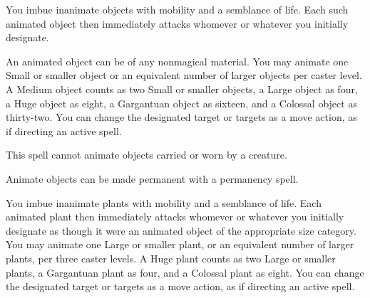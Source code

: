 \begin{multicols}{2}
\begin{small}

\noindent You imbue inanimate objects with mobility and a semblance of life. Each such animated object then immediately attacks whomever or whatever you initially designate.

\smallskip\noindent An animated object can be of any nonmagical material. You may animate one Small or smaller object or an equivalent number of larger objects per caster level. A Medium object counts as two Small or smaller objects, a Large object as four, a Huge object as eight, a Gargantuan object as sixteen, and a Colossal object as thirty-two. You can change the designated target or targets as a move action, as if directing an active spell.

\smallskip\noindent This spell cannot animate objects carried or worn by a creature.

\smallskip\noindent Animate objects can be made permanent with a permanency spell.

\smallskip\noindent You imbue inanimate plants with mobility and a semblance of life. Each animated plant then immediately attacks whomever or whatever you initially designate as though it were an animated object of the appropriate size category. You may animate one Large or smaller plant, or an equivalent number of larger plants, per three caster levels. A Huge plant counts as two Large or smaller plants, a Gargantuan plant as four, and a Colossal plant as eight. You can change the designated target or targets as a move action, as if directing an active spell.


\end{small}
\end{multicols}
